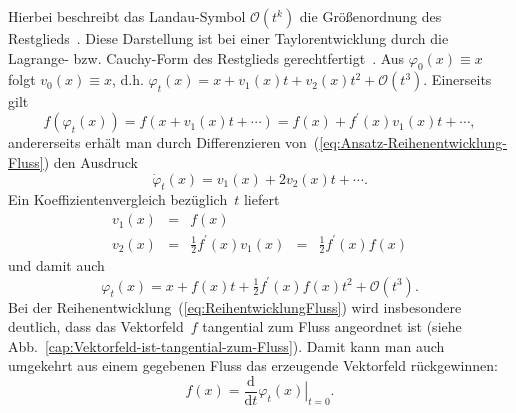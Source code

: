 Hierbei beschreibt das Landau-Symbol $\mathcal{O}(t^{k})$ die Größenordnung
des Restglieds~\cite[Abschn.~{1.3.1.4}]{zeidler2003}. Diese Darstellung
ist bei einer Taylorentwicklung durch die Lagrange- bzw. Cauchy-Form
des Restglieds gerechtfertigt~\cite{kaballo2000ana1}.
Aus $\varphi_{0}(x)\equiv x$
folgt $v_{0}(x)\equiv x$, d.h. $\varphi_{t}(x)=x+v_{1}(x)t+v_{2}(x)t^{2}+\mathcal{O}(t^{3})$.
Einerseits gilt
\[
f(\varphi_{t}(x))=f(x+v_{1}(x)t+\cdots)=f(x)+f^{\prime}(x)v_{1}(x)t+\cdots,
\]
andererseits erhält man durch Differenzieren von~(\ref{eq:Ansatz-Reihenentwicklung-Fluss})
den Ausdruck
\[
\dot{\varphi}_{t}(x)=v_{1}(x)+2v_{2}(x)t+\cdots.
\]
Ein Koeffizientenvergleich bezüglich~$t$ liefert
\[
\begin{array}{lclcl}
v_{1}(x) & = & f(x)\\
v_{2}(x) & = & \tfrac{1}{2} f^{\prime}(x)v_{1}(x) & = & \tfrac{1}{2} f^{\prime}(x)f(x)
\end{array}
\]
und damit auch
\begin{equation}
\varphi_{t}(x)=x+f(x)t+\tfrac{1}{2} f^{\prime}(x)f(x)t^{2}+\mathcal{O}(t^{3}).\label{eq:ReihentwicklungFluss}
\end{equation}
Bei der Reihenentwicklung~(\ref{eq:ReihentwicklungFluss}) wird insbesondere
deutlich, dass das Vektorfeld~$f$ tangential zum Fluss angeordnet
ist (siehe Abb.~\ref{cap:Vektorfeld-ist-tangential-zum-Fluss}).
Damit kann man auch umgekehrt aus einem gegebenen Fluss das erzeugende
Vektor\-feld rückgewinnen:
\begin{equation}
f(x)=\frac{{\mathrm{d}}}{{\mathrm{d}} t}\left.\varphi_{t}(x)\right|_{t=0}.\label{eq:VF-tangential-zum-Fluss}
\end{equation}


